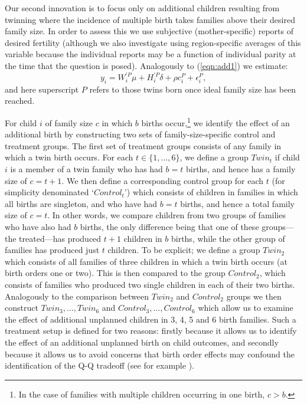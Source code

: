 \documentclass{article}[12pt,subeqn]
\begin{document}
\begin{spacing}{1.5}
Our second innovation is to focus only on additional children resulting from twinning where the incidence of multiple birth takes families above their desired family size.  In order to assess this we use subjective (mother-specific) reports of desired fertility (although we also investigate using region-specific averages of this variable because the individual reports may be a function of individual parity at the time that the question is posed).  Analogously to (\ref{eqn:add1}) we estimate:
\begin{equation}
\label{eqn:add2}
y_i=W^{\prime P}_i\mu+ H^{\prime P}_i\delta + \rho c_i^P + \epsilon_i^P,
\end{equation}
and here superscript $P$ refers to those twins born once ideal family size has been reached.

For child $i$ of family size $c$ in which $b$ births occur,\footnote{In the case of families with multiple children occurring in one birth, $c>b$.} we identify the effect of an additional birth by constructing two sets of family-size-specific control and treatment groups.  The first set of treatment groups consists of any family in which a twin birth occurs.  For each $t\in \{1,\ldots,6\}$, we define a group $Twin_t$ if child $i$ is a member of a twin family who has had $b=t$ births, and hence has a family size of $c=t+1$.  We then define a corresponding control group for each $t$ (for simplicity denominated `$Control_t$') which consists of children in families in which all births are singleton, and who have had $b=t$ births, and hence a total family size of $c=t$.  In other words, we compare children from two groups of families who have also had $b$ births, the only difference being that one of these groups---the treated---has produced $t+1$ children in $b$ births, while the other group of families has produced just $t$ children.  To be explicit; we define a group $Twin_2$ which consists of all families of three children in which a twin birth occurs (at birth orders one or two).  This is then compared to the group $Control_2$, which consists of families who produced two single children in each of their two births.  Analogously to the comparison between $Twin_2$ and $Control_2$ groups we then construct $Twin_3,\ldots,Twin_6$ and $Control_3,\ldots,Control_6$ which allow us to examine the effect of additional unplanned children in 3, 4, 5 and 6 birth families.  Such a treatment setup is defined for two reasons: firstly because it allows us to identify the effect of an additional unplanned birth on child outcomes, and secondly because it allows us to avoid concerns that birth order effects may confound the identification of the Q-Q tradeoff (see for example \citet{Blacketal2005}).


\end{spacing}
\end{document}
